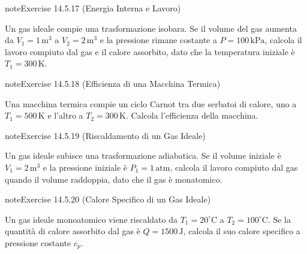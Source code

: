 \documentclass[letterpaper,10pt,italian]{jupyterBook}
\begin{document}
\begin{sphinxadmonition}{note}{Exercise 14.5.17 (Energia Interna e Lavoro)}



\sphinxAtStartPar
Un gas ideale compie una trasformazione isobara. Se il volume del gas aumenta da \(V_1 = 1 \, \text{m}^3\) a \(V_2 = 2 \, \text{m}^3\) e la pressione rimane costante a \(P = 100 \, \text{kPa}\), calcola il lavoro compiuto dal gas e il calore assorbito, dato che la temperatura iniziale è \(T_1 = 300 \, \text{K}\).
\end{sphinxadmonition}
 \label{exercise:ch/thermodynamics/foundation-problems-exercise-17}

\begin{sphinxadmonition}{note}{Exercise 14.5.18 (Efficienza di una Macchina Termica)}



\sphinxAtStartPar
Una macchina termica compie un ciclo Carnot tra due serbatoi di calore, uno a \(T_1 = 500 \, \text{K}\) e l’altro a \(T_2 = 300 \, \text{K}\). Calcola l’efficienza della macchina.
\end{sphinxadmonition}
 \label{exercise:ch/thermodynamics/foundation-problems-exercise-18}

\begin{sphinxadmonition}{note}{Exercise 14.5.19 (Riscaldamento di un Gas Ideale)}



\sphinxAtStartPar
Un gas ideale subisce una trasformazione adiabatica. Se il volume iniziale è \(V_1 = 2 \, \text{m}^3\) e la pressione iniziale è \(P_1 = 1 \, \text{atm}\), calcola il lavoro compiuto dal gas quando il volume raddoppia, dato che il gas è monatomico.
\end{sphinxadmonition}
 \label{exercise:ch/thermodynamics/foundation-problems-exercise-19}

\begin{sphinxadmonition}{note}{Exercise 14.5.20 (Calore Specifico di un Gas Ideale)}



\sphinxAtStartPar
Un gas ideale monoatomico viene riscaldato da \(T_1 = 20^\circ \text{C}\) a \(T_2 = 100^\circ \text{C}\). Se la quantità di calore assorbito dal gas è \(Q = 1500 \, \text{J}\), calcola il suo calore specifico a pressione costante \(c_p\).
\end{sphinxadmonition}
 \label{exercise:ch/thermodynamics/foundation-problems-exercise-20}
\end{document}
